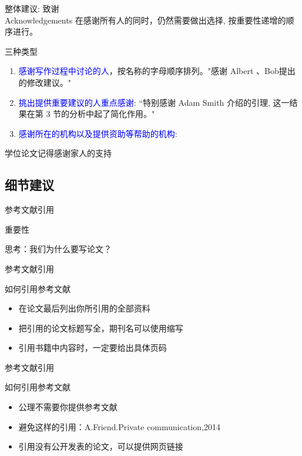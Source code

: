 \documentclass[UTF8]{ctexbeamer}
\begin{document}
\begin{frame}{整体建议: 致谢 \\ Acknowledgements}
在感谢所有人的同时，仍然需要做出选择, 按重要性递增的顺序进行。
\begin{alertblock}{三种类型}
\begin{enumerate}
    \item \textcolor{blue}{感谢写作过程中讨论的人}，按名称的字母顺序排列。"感谢 Albert 、Bob提出的修改建议。"
    \item \textcolor{blue}{挑出提供重要建议的人重点感谢}: “特别感谢 Adam Smith 介绍的引理, 这一结果在第 3 节的分析中起了简化作用。" 
    \item \textcolor{blue}{感谢所在的机构以及提供资助等帮助的机构}: 
\end{enumerate}
\begin{alertblock}{学位论文记得感谢家人的支持}

\end{alertblock}
\end{alertblock}
\end{frame}


\subsection{细节建议}
\begin{frame}{参考文献引用}
    \begin{alertblock}{重要性}
    \end{alertblock}
     思考：我们为什么要写论文？
\end{frame}

\begin{frame}{参考文献引用}
    \begin{alertblock}{如何引用参考文献}
    \end{alertblock}
    \begin{itemize}
          \item 在论文最后列出你所引用的全部资料
          \item 把引用的论文标题写全，期刊名可以使用缩写
          \item 引用书籍中内容时，一定要给出具体页码
    \end{itemize}
\end{frame}

\begin{frame}{参考文献引用}
    \begin{alertblock}{如何引用参考文献} 
    \end{alertblock} 
    \begin{itemize}
        \item 公理不需要你提供参考文献
        \item 避免这样的引用：A.Friend.Private communication,2014
        \item 引用没有公开发表的论文，可以提供网页链接
    \end{itemize}
\end{frame}
\end{document}
